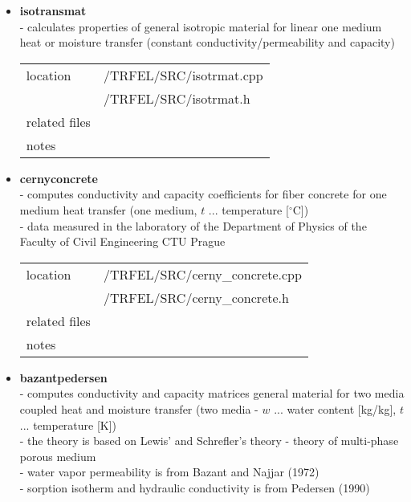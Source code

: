 \begin{itemize}
\item{\bf isotransmat}\\ 
- calculates properties of general isotropic material for linear one medium heat or moisture transfer 
(constant conductivity/permeability and capacity)

\begin{center}
\begin{tabular}{|l|l|}
\hline
location & /TRFEL/SRC/isotrmat.cpp\\
         & /TRFEL/SRC/isotrmat.h
\\ \hline
related files &
\\ \hline
notes & 
\\ \hline
\end{tabular}
\end{center}

\item{\bf cernyconcrete}\\ 
- computes conductivity and capacity coefficients for fiber concrete for one medium heat transfer (one medium, $t$ ... temperature [$^\circ$C])\\
- data measured in the laboratory of the Department of Physics of the Faculty of Civil Engineering CTU Prague

\begin{center}
\begin{tabular}{|l|l|}
\hline
location & /TRFEL/SRC/cerny\_concrete.cpp\\
         & /TRFEL/SRC/cerny\_concrete.h
\\ \hline
related files &
\\ \hline
notes & 
\\ \hline
\end{tabular}
\end{center}

\item{\bf bazantpedersen}\\ 
- computes conductivity and capacity matrices general material for two media coupled heat and moisture transfer (two media - $w$ ... water content [kg/kg], $t$ ... temperature [K])\\
- the theory is based on Lewis' and Schrefler's theory - theory of multi-phase porous medium\\
- water vapor permeability is from Bazant and Najjar (1972)~\cite{bazant_n}\\
- sorption isotherm and hydraulic conductivity is from Pedersen (1990)~\cite{pedersen}


\end{itemize}
